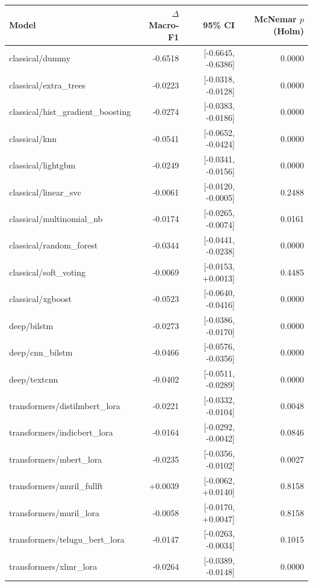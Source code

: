 \begin{tabular}{lrrr}
\hline
Model & $\Delta$ Macro-F1 & 95\% CI & McNemar $p$ (Holm) \\
\hline
classical/dummy & -0.6518 & [-0.6645, -0.6386] & 0.0000 \\
classical/extra\_trees & -0.0223 & [-0.0318, -0.0128] & 0.0000 \\
classical/hist\_gradient\_boosting & -0.0274 & [-0.0383, -0.0186] & 0.0000 \\
classical/knn & -0.0541 & [-0.0652, -0.0424] & 0.0000 \\
classical/lightgbm & -0.0249 & [-0.0341, -0.0156] & 0.0000 \\
classical/linear\_svc & -0.0061 & [-0.0120, -0.0005] & 0.2488 \\
classical/multinomial\_nb & -0.0174 & [-0.0265, -0.0074] & 0.0161 \\
classical/random\_forest & -0.0344 & [-0.0441, -0.0238] & 0.0000 \\
classical/soft\_voting & -0.0069 & [-0.0153, +0.0013] & 0.4485 \\
classical/xgboost & -0.0523 & [-0.0640, -0.0416] & 0.0000 \\
deep/bilstm & -0.0273 & [-0.0386, -0.0170] & 0.0000 \\
deep/cnn\_bilstm & -0.0466 & [-0.0576, -0.0356] & 0.0000 \\
deep/textcnn & -0.0402 & [-0.0511, -0.0289] & 0.0000 \\
transformers/distilmbert\_lora & -0.0221 & [-0.0332, -0.0104] & 0.0048 \\
transformers/indicbert\_lora & -0.0164 & [-0.0292, -0.0042] & 0.0846 \\
transformers/mbert\_lora & -0.0235 & [-0.0356, -0.0102] & 0.0027 \\
transformers/muril\_fullft & +0.0039 & [-0.0062, +0.0140] & 0.8158 \\
transformers/muril\_lora & -0.0058 & [-0.0170, +0.0047] & 0.8158 \\
transformers/telugu\_bert\_lora & -0.0147 & [-0.0263, -0.0034] & 0.1015 \\
transformers/xlmr\_lora & -0.0264 & [-0.0389, -0.0148] & 0.0000 \\
\hline
\end{tabular}
